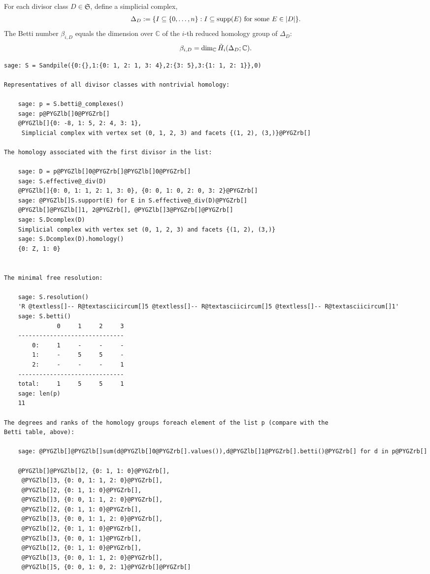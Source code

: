 \documentclass[letterpaper,10pt,english]{manual}
\begin{document}
For each divisor class $D\in\mathfrak{S}$, define a simplicial complex,
\begin{gather}
\begin{split}\Delta_D := \{I\subseteq\{0,\dots,n\}: I\subseteq\mbox{supp}(E)\mbox{ for some}\
E\in |D|\}.\end{split}\notag
\end{gather}
The Betti number $\beta_{i,D}$ equals the dimension over $\mathbb{C}$ of the
$i$-th reduced homology group of $\Delta_D$:
\begin{gather}
\begin{split}\beta_{i,D} = \dim_{\mathbb{C}}\tilde{H}_i(\Delta_D;\mathbb{C}).\end{split}\notag
\end{gather}
\begin{Verbatim}[commandchars=@\[\]]
        sage: S = Sandpile({0:{},1:{0: 1, 2: 1, 3: 4},2:{3: 5},3:{1: 1, 2: 1}},0)

Representatives of all divisor classes with nontrivial homology:

    sage: p = S.betti@_complexes()
    sage: p@PYGZlb[]0@PYGZrb[]
    @PYGZlb[]{0: -8, 1: 5, 2: 4, 3: 1},
     Simplicial complex with vertex set (0, 1, 2, 3) and facets {(1, 2), (3,)}@PYGZrb[]

The homology associated with the first divisor in the list:

    sage: D = p@PYGZlb[]0@PYGZrb[]@PYGZlb[]0@PYGZrb[]
    sage: S.effective@_div(D)
    @PYGZlb[]{0: 0, 1: 1, 2: 1, 3: 0}, {0: 0, 1: 0, 2: 0, 3: 2}@PYGZrb[]
    sage: @PYGZlb[]S.support(E) for E in S.effective@_div(D)@PYGZrb[]
    @PYGZlb[]@PYGZlb[]1, 2@PYGZrb[], @PYGZlb[]3@PYGZrb[]@PYGZrb[]
    sage: S.Dcomplex(D)
    Simplicial complex with vertex set (0, 1, 2, 3) and facets {(1, 2), (3,)}
    sage: S.Dcomplex(D).homology()
    {0: Z, 1: 0}


The minimal free resolution:

    sage: S.resolution()
    'R @textless[]-- R@textasciicircum[]5 @textless[]-- R@textasciicircum[]5 @textless[]-- R@textasciicircum[]1'
    sage: S.betti()
               0     1     2     3
    ------------------------------
        0:     1     -     -     -
        1:     -     5     5     -
        2:     -     -     -     1
    ------------------------------
    total:     1     5     5     1
    sage: len(p)
    11

The degrees and ranks of the homology groups foreach element of the list p (compare with the
Betti table, above):

    sage: @PYGZlb[]@PYGZlb[]sum(d@PYGZlb[]0@PYGZrb[].values()),d@PYGZlb[]1@PYGZrb[].betti()@PYGZrb[] for d in p@PYGZrb[]

    @PYGZlb[]@PYGZlb[]2, {0: 1, 1: 0}@PYGZrb[],
     @PYGZlb[]3, {0: 0, 1: 1, 2: 0}@PYGZrb[],
     @PYGZlb[]2, {0: 1, 1: 0}@PYGZrb[],
     @PYGZlb[]3, {0: 0, 1: 1, 2: 0}@PYGZrb[],
     @PYGZlb[]2, {0: 1, 1: 0}@PYGZrb[],
     @PYGZlb[]3, {0: 0, 1: 1, 2: 0}@PYGZrb[],
     @PYGZlb[]2, {0: 1, 1: 0}@PYGZrb[],
     @PYGZlb[]3, {0: 0, 1: 1}@PYGZrb[],
     @PYGZlb[]2, {0: 1, 1: 0}@PYGZrb[],
     @PYGZlb[]3, {0: 0, 1: 1, 2: 0}@PYGZrb[],
     @PYGZlb[]5, {0: 0, 1: 0, 2: 1}@PYGZrb[]@PYGZrb[]
\end{Verbatim}
\end{document}
